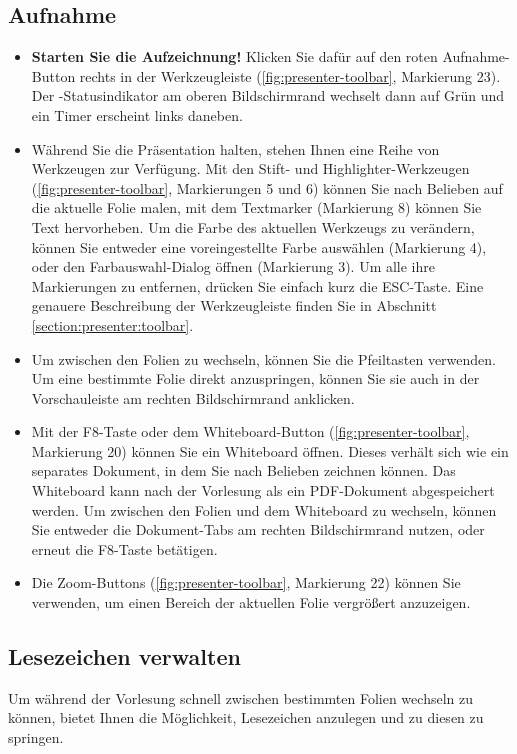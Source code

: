 \subsection{Aufnahme}
\begin{itemize}
\item \textbf{Starten Sie die Aufzeichnung!} Klicken Sie dafür auf den roten Aufnahme-Button rechts in der Werkzeugleiste (\autoref{fig:presenter-toolbar}, Markierung 23). Der -Statusindikator am oberen Bildschirmrand wechselt dann auf Grün und ein Timer erscheint links daneben.

\item Während Sie die Präsentation halten, stehen Ihnen eine Reihe von Werkzeugen zur Verfügung. Mit den Stift- und Highlighter-Werkzeugen (\autoref{fig:presenter-toolbar}, Markierungen 5 und 6) können Sie nach Belieben auf die aktuelle Folie malen, mit dem Textmarker (Markierung 8) können Sie Text hervorheben. Um die Farbe des aktuellen Werkzeugs zu verändern, können Sie entweder eine voreingestellte Farbe auswählen (Markierung 4), oder den Farbauswahl-Dialog öffnen (Markierung 3). Um alle ihre Markierungen zu entfernen, drücken Sie einfach kurz die ESC-Taste.
Eine genauere Beschreibung der Werkzeugleiste finden Sie in Abschnitt \ref{section:presenter:toolbar}.

\item Um zwischen den Folien zu wechseln, können Sie die Pfeiltasten verwenden. Um eine bestimmte Folie direkt anzuspringen, können Sie sie auch in der Vorschauleiste am rechten Bildschirmrand anklicken.

\item Mit der F8-Taste oder dem Whiteboard-Button (\autoref{fig:presenter-toolbar}, Markierung 20) können Sie ein Whiteboard öffnen. Dieses verhält sich wie ein separates Dokument, in dem Sie nach Belieben zeichnen können. Das Whiteboard kann nach der Vorlesung als ein PDF-Dokument abgespeichert werden. Um zwischen den Folien und dem Whiteboard zu wechseln, können Sie entweder die Dokument-Tabs am rechten Bildschirmrand nutzen, oder erneut die F8-Taste betätigen.

\item Die Zoom-Buttons (\autoref{fig:presenter-toolbar}, Markierung 22) können Sie verwenden, um einen Bereich der aktuellen Folie vergrößert anzuzeigen.
\end{itemize}


\subsection{Lesezeichen verwalten}
\label{section:presenter-bookmarks}
Um während der Vorlesung schnell zwischen bestimmten Folien wechseln zu können, bietet Ihnen \lectPresenter{} die Möglichkeit, Lesezeichen anzulegen und zu diesen zu springen.


